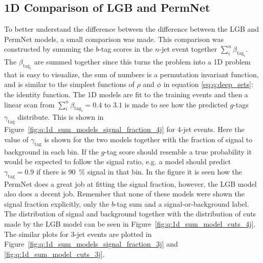 \subsection{1D Comparison of LGB and PermNet}
\label{subsec:q:lgb_permnet_comparison}

To better understand the difference between the difference between the LGB and PermNet models, a small comparison was made. This comparison was constructed by summing the $b$-tag scores in the $n$-jet event together $\sum_i^n \beta_{\mathrm{tag}_i}$. The $\beta_{\mathrm{tag}_i}$ are summed together since this turns the problem into a \num{1}D problem that is easy to visualize, the sum of numbers is a permutation invariant function, and is similar to the simplest functions of $\rho$ and $\phi$ in equation \eqref{eq:q:deep_sets}: the identity function. The 1D models are fit to the training events and then a linear scan from $\sum_i^n \beta_{\mathrm{tag}_i}=0.4$ to $3.1$ is made to see how the predicted $g$-tags $\gamma_\mathrm{tag}$ distribute. This is shown in Figure~\ref{fig:q:1d_sum_models_signal_fraction_4j} for 4-jet events. Here the value of $\gamma_\mathrm{tag}$ is shown for the two models together with the fraction of signal to background in each bin. If the $g$-tag score should resemble a true probability it would be expected to follow the signal ratio, e.g. a model should predict $\gamma_\mathrm{tag}=0.9$ if there is \SI{90}{\percent} signal in that bin. In the figure it is seen how the PermNet does a great job at fitting the signal fraction, however, the LGB model also does a decent job. Remember that none of these models were shown the signal fraction explicitly, only the $b$-tag sum and a signal-or-background label. The distribution of signal and background together with the distribution of cuts made by the LGB model can be seen in Figure~\ref{fig:q:1d_sum_model_cuts_4j}. The similar plots for 3-jet events are plotted in Figure~\ref{fig:q:1d_sum_models_signal_fraction_3j} and \ref{fig:q:1d_sum_model_cuts_3j}.

